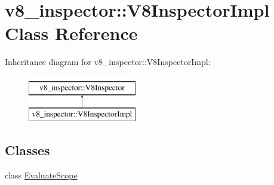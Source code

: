\hypertarget{classv8__inspector_1_1V8InspectorImpl}{}\section{v8\+\_\+inspector\+:\+:V8\+Inspector\+Impl Class Reference}
\label{classv8__inspector_1_1V8InspectorImpl}
Inheritance diagram for v8\+\_\+inspector\+:\+:V8\+Inspector\+Impl\+:\begin{figure}[H]
\begin{center}
\leavevmode
\includegraphics[height=2.000000cm]{classv8__inspector_1_1V8InspectorImpl}
\end{center}
\end{figure}
\subsection*{Classes}
\begin{DoxyCompactItemize}
\item 
class \mbox{\hyperlink{classv8__inspector_1_1V8InspectorImpl_1_1EvaluateScope}{Evaluate\+Scope}}
\end{DoxyCompactItemize}
